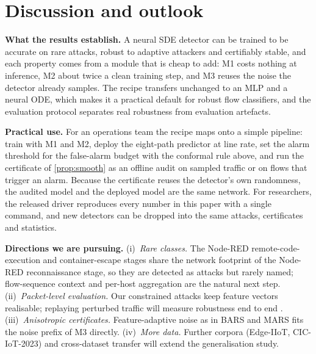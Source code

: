 \documentclass{article}
\theoremstyle{definition}
\begin{document}
\section{Discussion and outlook}\label{sec:disc}
\textbf{What the results establish.} A neural SDE detector can be trained to be
accurate on rare attacks, robust to adaptive attackers and certifiably stable,
and each property comes from a module that is cheap to add: M1 costs nothing at
inference, M2 about twice a clean training step, and M3 reuses the noise the
detector already samples. The recipe transfers unchanged to an MLP and a neural
ODE, which makes it a practical default for robust flow classifiers, and the
evaluation protocol separates real robustness from evaluation artefacts.

\textbf{Practical use.} For an operations team the recipe maps onto a simple
pipeline: train with M1 and M2, deploy the eight-path predictor at line rate,
set the alarm threshold for the false-alarm budget with the conformal rule
above, and run the certificate of \cref{prop:smooth} as an offline audit on
sampled traffic or on flows that trigger an alarm. Because the certificate reuses the
detector's own randomness, the audited model and the deployed model are the
same network. For researchers, the released driver reproduces every number in
this paper with a single command, and new detectors can be dropped into the
same attacks, certificates and statistics.

\textbf{Directions we are pursuing.}
(i)~\emph{Rare classes.} The Node-RED remote-code-execution and container-escape
stages share the network footprint of the Node-RED reconnaissance stage, so they
are detected as attacks but rarely named; flow-sequence context and per-host
aggregation are the natural next step.
(ii)~\emph{Packet-level evaluation.} Our constrained attacks keep feature vectors
realisable; replaying perturbed traffic will measure robustness end to end
\citep{simonetto2024tabularbench}.
(iii)~\emph{Anisotropic certificates.} Feature-adaptive noise as in BARS and MARS
\citep{wang2023bars,huang2025mars} fits the noise prefix of M3 directly.
(iv)~\emph{More data.} Further corpora (Edge-IIoT, CIC-IoT-2023) and
cross-dataset transfer will extend the generalisation study.

\end{document}
